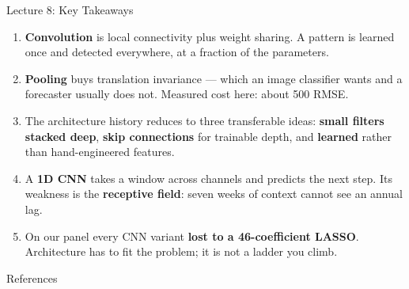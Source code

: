 \documentclass[aspectratio=169, 11pt]{beamer}
\begin{document}
\begin{frame}{Lecture 8: Key Takeaways}
  \begin{keybox}
    {\footnotesize
    \begin{enumerate}\itemsep2pt
      \item \textbf{Convolution} is local connectivity plus weight sharing. A pattern is learned
            once and detected everywhere, at a fraction of the parameters.

      \item \textbf{Pooling} buys translation invariance --- which an image classifier wants and
            a forecaster usually does not. Measured cost here: about 500 RMSE.

      \item The architecture history reduces to three transferable ideas: \textbf{small filters
            stacked deep}, \textbf{skip connections} for trainable depth, and \textbf{learned}
            rather than hand-engineered features.

      \item A \textbf{1D CNN} takes a window across channels and predicts the next step. Its
            weakness is the \textbf{receptive field}: seven weeks of context cannot see an annual
            lag.

      \item On our panel every CNN variant \textbf{lost to a 46-coefficient LASSO}. Architecture
            has to fit the problem; it is not a ladder you climb.
    \end{enumerate}
    }
  \end{keybox}
\end{frame}

\begin{frame}[allowframebreaks]{References}
  \printbibliography[heading=none]
\end{frame}

\end{document}
